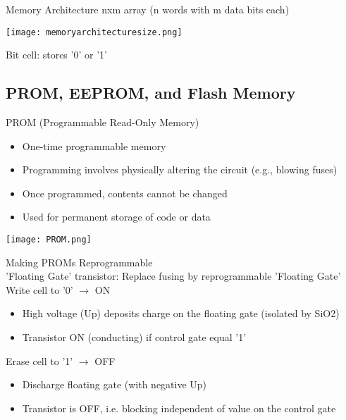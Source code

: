\multend

\begin{concept}{Memory Architecture} nxm array (n words with m data bits each)

    \texttt{[image: memoryarchitecturesize.png]}

    \textcolor{tangerine}{Bit cell}: stores '0' or '1'

\end{concept}

\subsection{PROM, EEPROM, and Flash Memory}



\begin{concept}{PROM (Programmable Read-Only Memory)}
\begin{itemize}
    \item One-time programmable memory
    \item Programming involves physically altering the circuit (e.g., blowing fuses)
    \item Once programmed, contents cannot be changed
    \item Used for permanent storage of code or data
\end{itemize}
\texttt{[image: PROM.png]}
\end{concept}

\begin{theorem}{Making PROMs Reprogrammable}\\
    'Floating Gate' transistor: Replace fusing by reprogrammable 'Floating Gate'
    \vspace{1mm}\\
Write cell to '0' $\rightarrow$ ON
\begin{itemize}
    \item High voltage (Up) deposits charge on the floating gate (isolated by SiO2)
    \item Transistor ON (conducting) if control gate equal '1'
\end{itemize}
\vspace{1mm}
Erase cell to '1' $\rightarrow$ OFF
\begin{itemize}
    \item Discharge floating gate (with negative Up)
    \item Transistor is OFF, i.e. blocking independent of value on the control gate
\end{itemize}
\end{theorem}

